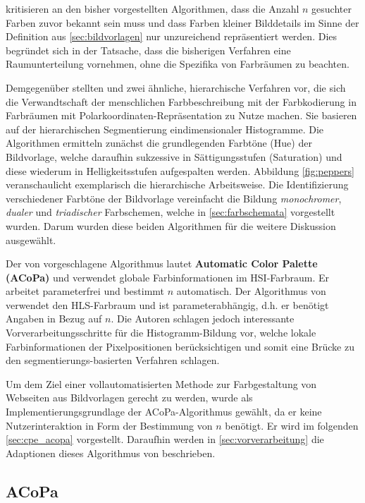\citet{acopa} kritisieren an den bisher vorgestellten Algorithmen, dass die Anzahl $n$ gesuchter Farben zuvor bekannt sein muss und dass Farben kleiner Bilddetails im Sinne der Definition aus \ref{sec:bildvorlagen} nur unzureichend repräsentiert werden. Dies begründet sich in der Tatsache, dass die bisherigen Verfahren eine Raumunterteilung vornehmen, ohne die Spezifika von Farbräumen zu beachten.

Demgegenüber stellten \citet{acopa} und \citet{image-based-schemes} zwei ähnliche, hierarchische Verfahren vor, die sich die Verwandtschaft der menschlichen Farbbeschreibung mit der Farbkodierung in Farbräumen mit Polarkoordinaten-Repräsentation zu Nutze machen. Sie basieren auf der hierarchischen Segmentierung eindimensionaler Histogramme. Die Algorithmen ermitteln zunächst die grundlegenden Farbtöne (Hue) der Bildvorlage, welche daraufhin sukzessive in Sättigungsstufen (Saturation) und diese wiederum in Helligkeitsstufen aufgespalten werden. Abbildung \ref{fig:peppers} veranschaulicht exemplarisch die hierarchische Arbeitsweise. Die Identifizierung verschiedener Farbtöne der Bildvorlage vereinfacht die Bildung \emph{monochromer}, \emph{dualer} und \emph{triadischer} Farbschemen, welche in \autoref{sec:farbschemata} vorgestellt wurden. Darum wurden diese beiden Algorithmen für die weitere Diskussion ausgewählt.

Der von \citet{acopa} vorgeschlagene Algorithmus lautet  \textbf{Automatic Color Palette (ACoPa)} und verwendet globale Farbinformationen im HSI-Farbraum. Er arbeitet parameterfrei und bestimmt $n$ automatisch. Der Algorithmus von \citet{image-based-schemes} verwendet den HLS-Farbraum und ist parameterabhängig, d.h. er benötigt Angaben in Bezug auf $n$. Die Autoren schlagen jedoch interessante Vorverarbeitungsschritte für die Histogramm-Bildung vor, welche lokale Farbinformationen der Pixelpositionen berücksichtigen und somit eine Brücke zu den segmentierungs-basierten Verfahren schlagen.

Um dem Ziel einer vollautomatisierten Methode zur Farbgestaltung von Webseiten aus Bildvorlagen gerecht zu werden, wurde als Implementierungsgrundlage der ACoPa-Algorithmus gewählt, da er keine Nutzerinteraktion in Form der Bestimmung von $n$ benötigt. Er wird im folgenden \autoref{sec:cpe_acopa} vorgestellt. Daraufhin werden in \autoref{sec:vorverarbeitung} die Adaptionen dieses Algorithmus von \citet{image-based-schemes} beschrieben.



\subsection{ACoPa}
\label{sec:cpe_acopa}

